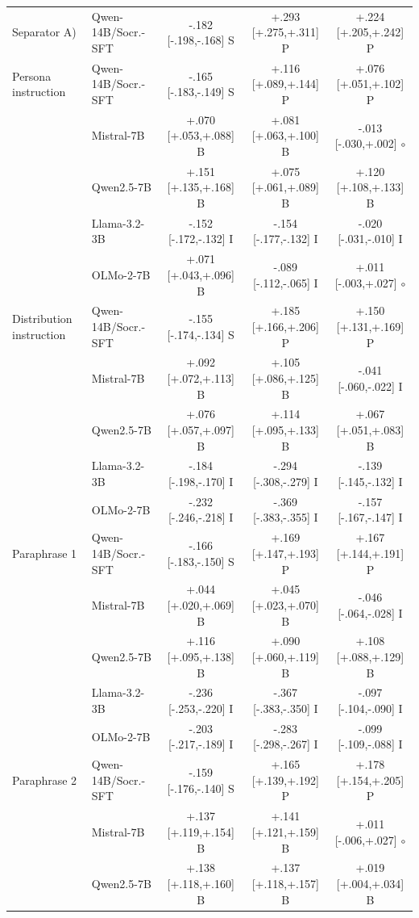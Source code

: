 \begin{table}[t]
\begin{tabular}{@{}llccc@{}}
\addlinespace[1pt]
Separator A) & Qwen-14B/Socr.-SFT & -.182 [-.198,-.168] S & +.293 [+.275,+.311] P & +.224 [+.205,+.242] P \\
\addlinespace[1pt]
Persona instruction & Qwen-14B/Socr.-SFT & -.165 [-.183,-.149] S & +.116 [+.089,+.144] P & +.076 [+.051,+.102] P \\
 & Mistral-7B & +.070 [+.053,+.088] B & +.081 [+.063,+.100] B & -.013 [-.030,+.002] $\circ$ \\
 & Qwen2.5-7B & +.151 [+.135,+.168] B & +.075 [+.061,+.089] B & +.120 [+.108,+.133] B \\
 & Llama-3.2-3B & -.152 [-.172,-.132] I & -.154 [-.177,-.132] I & -.020 [-.031,-.010] I \\
 & OLMo-2-7B & +.071 [+.043,+.096] B & -.089 [-.112,-.065] I & +.011 [-.003,+.027] $\circ$ \\
\addlinespace[1pt]
Distribution instruction & Qwen-14B/Socr.-SFT & -.155 [-.174,-.134] S & +.185 [+.166,+.206] P & +.150 [+.131,+.169] P \\
 & Mistral-7B & +.092 [+.072,+.113] B & +.105 [+.086,+.125] B & -.041 [-.060,-.022] I \\
 & Qwen2.5-7B & +.076 [+.057,+.097] B & +.114 [+.095,+.133] B & +.067 [+.051,+.083] B \\
 & Llama-3.2-3B & -.184 [-.198,-.170] I & -.294 [-.308,-.279] I & -.139 [-.145,-.132] I \\
 & OLMo-2-7B & -.232 [-.246,-.218] I & -.369 [-.383,-.355] I & -.157 [-.167,-.147] I \\
\addlinespace[1pt]
Paraphrase 1 & Qwen-14B/Socr.-SFT & -.166 [-.183,-.150] S & +.169 [+.147,+.193] P & +.167 [+.144,+.191] P \\
 & Mistral-7B & +.044 [+.020,+.069] B & +.045 [+.023,+.070] B & -.046 [-.064,-.028] I \\
 & Qwen2.5-7B & +.116 [+.095,+.138] B & +.090 [+.060,+.119] B & +.108 [+.088,+.129] B \\
 & Llama-3.2-3B & -.236 [-.253,-.220] I & -.367 [-.383,-.350] I & -.097 [-.104,-.090] I \\
 & OLMo-2-7B & -.203 [-.217,-.189] I & -.283 [-.298,-.267] I & -.099 [-.109,-.088] I \\
\addlinespace[1pt]
Paraphrase 2 & Qwen-14B/Socr.-SFT & -.159 [-.176,-.140] S & +.165 [+.139,+.192] P & +.178 [+.154,+.205] P \\
 & Mistral-7B & +.137 [+.119,+.154] B & +.141 [+.121,+.159] B & +.011 [-.006,+.027] $\circ$ \\
 & Qwen2.5-7B & +.138 [+.118,+.160] B & +.137 [+.118,+.157] B & +.019 [+.004,+.034] B \\

\end{tabular}
\end{table}
